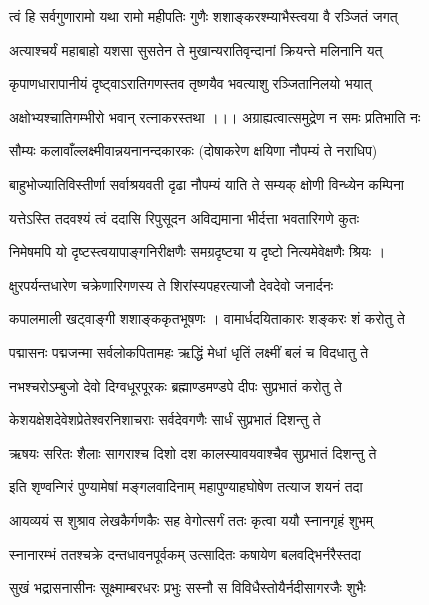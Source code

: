 \twolineshloka
{त्वं हि सर्वगुणारामो यथा रामो महीपतिः}
{गुणैः शशाङ्करश्म्याभैस्त्वया वै रञ्जितं जगत्}%

\twolineshloka
{अत्याश्चर्यं महाबाहो यशसा सुसतेन ते}
{मुखान्यरातिवृन्दानां क्रियन्ते मलिनानि यत्} %

\twolineshloka
{कृपाणधारापानीयं दृष्ट्वाऽरातिगणस्तव}
{तृष्णयैव भवत्याशु रञ्जितानिलयो भयात्}%

\twolineshloka
{अक्षोभ्यश्चातिगम्भीरो भवान् रत्नाकरस्तथा ।।।}
{अग्राह्यत्वात्समुद्रेण न समः प्रतिभाति नः}%

\twolineshloka
{सौम्यः कलावाँल्लक्ष्मीवान्नयनानन्दकारकः}
{(दोषाकरेण क्षयिणा नौपम्यं ते नराधिप)}%

\twolineshloka
{बाहुभोज्यातिविस्तीर्णा सर्वाश्रयवती दृढा}
{नौपम्यं याति ते सम्यक् क्षोणी विन्ध्येन कम्पिना}%

\twolineshloka
{यत्तेऽस्ति तदवश्यं त्वं ददासि रिपुसूदन}
{अविद्यमाना भीर्दत्ता भवतारिगणे कुतः}%

\twolineshloka
{निमेषमपि यो दृष्टस्त्वयापाङ्गनिरीक्षणैः}
{समग्रदृष्ट्या य दृष्टो नित्यमेवेक्षणैः श्रियः ।}%

\twolineshloka
{क्षुरपर्यन्तधारेण चक्रेणारिगणस्य ते}
{शिरांस्यपहरत्याजौ देवदेवो जनार्दनः}%

\twolineshloka
{कपालमाली खट्वाङ्गी शशाङ्ककृतभूषणः ।}
{वामार्धदयिताकारः शङ्करः शं करोतु ते}%

\twolineshloka
{पद्मासनः पद्मजन्मा सर्वलोकपितामहः}
{ऋद्धिं मेधां धृतिं लक्ष्मीं बलं च विदधातु ते}%

\twolineshloka
{नभश्चरोऽम्बुजो देवो दिग्वधूरपूरकः}
{ब्रह्माण्डमण्डपे दीपः सुप्रभातं करोतु ते} %

\twolineshloka
{केशयक्षेशदेवेशप्रेतेश्वरनिशाचराः}
{सर्वदेवगणैः सार्धं सुप्रभातं दिशन्तु ते}%

\twolineshloka
{ऋषयः सरितः शैलाः सागराश्च दिशो दश}
{कालस्यावयवाश्चैव सुप्रभातं दिशन्तु ते}%

\twolineshloka
{इति शृण्वन्गिरं पुण्यामेषां मङ्गलवादिनाम्}
{महापुण्याहघोषेण तत्याज शयनं तदा}%

\twolineshloka
{आयव्ययं स शुश्राव लेखकैर्गणकैः सह}
{वेगोत्सर्गं ततः कृत्वा ययौ स्नानगृहं शुभम्}%

\twolineshloka
{स्नानारम्भं ततश्चक्रे दन्तधावनपूर्वकम्}
{उत्सादितः कषायेण बलवद्भिर्नरैस्तदा}%

\twolineshloka
{सुखं भद्रासनासीनः सूक्ष्माम्बरधरः प्रभुः}
{सस्नौ स विविधैस्तोयैर्नदीसागरजैः शुभैः}%

